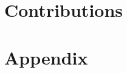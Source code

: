 \documentclass[ twoside,openright,titlepage,numbers=noenddot,%
                headinclude,footinclude,cleardoublepage=empty,abstract=on,
                BCOR=5mm,paper=a4,fontsize=10pt,
                ]{scrbook}
\begin{document}
\part{Contributions}\label{pt:contributions}





\cleardoublepage

\appendix
\cleardoublepage
\part{Appendix}
\cleardoublepage
\cleardoublepage
\cleardoublepage
\end{document}
